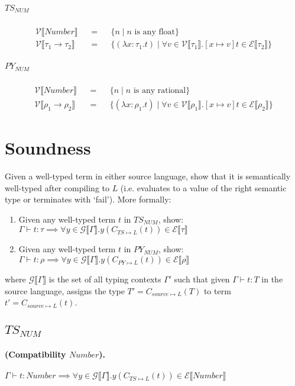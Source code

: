 \documentclass{article}
\newcommand{\makedenoteset}[3]{\mathcal{#1} \llbracket #2 \rrbracket && = && \{#3\}}
\newcommand{\denoteset}[2]{\mathcal{#1} \llbracket #2 \rrbracket}
\begin{document}
	
	\subparagraph{$TS_{NUM}$}
	\begin{align*}
		\makedenoteset{V}{Number}{n \mid n \text{ is any float}}\\
		\makedenoteset{V}{\tau_1 \rightarrow \tau_2}{
				(\lambda x\colon \tau_1.t)  \mid
				\forall v \in \denoteset{V}{\tau_1}.[x \mapsto v]t \in \denoteset{E}{\tau_2}
		}
	\end{align*}
	
	\subparagraph{$PY_{NUM}$}
	\begin{align*}
		\makedenoteset{V}{Number}{n \mid n \text{ is any rational}}\\
		\makedenoteset{V}{\rho_1 \rightarrow \rho_2}{
			(\lambda x: \rho_1.t) \mid
			\forall v \in \denoteset{V}{\rho_1}.[x \mapsto v]t \in \denoteset{E}{\rho_2}
		}
	\end{align*}
	
	\section{Soundness}

	Given a well-typed term in either source language, show that it is semantically well-typed after compiling to $L$ (i.e. evaluates to a value of the right semantic type or terminates with `fail'). More formally:
	
	\begin{enumerate}
		\item Given any well-typed term $t$ in $TS_{NUM}$, show:\\
		$\Gamma \vdash t: \tau \implies \forall y \in \denoteset{G}{\Gamma}. y(C_{TS \mapsto L}(t)) \in \denoteset{E}{\tau}$
		\item Given any well-typed term $t$ in $PY_{NUM}$, show:\\
		$\Gamma \vdash t: \rho \implies \forall y \in \denoteset{G}{\Gamma}. y(C_{PY \mapsto L}(t)) \in \denoteset{E}{\rho}$
	\end{enumerate}


	where $\denoteset{G}{\Gamma}$ is the set of all typing contexts $\Gamma'$ such that given $\Gamma \vdash t: T$ in the source language, assigns the type $T' = C_{source \mapsto L}(T)$ to term $t' = C_{source \mapsto L}(t)$.
	
	\subsection{$TS_{NUM}$}
	
	\paragraph{(Compatibility $Number$).}
	$\Gamma \vdash t: Number \implies \forall y \in \denoteset{G}{\Gamma}. y(C_{TS \mapsto L}(t)) \in \denoteset{E}{Number}$
	
\end{document}
